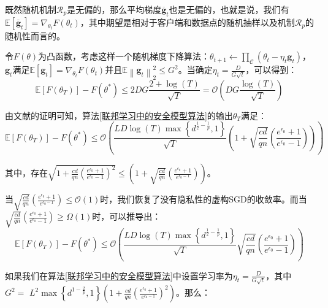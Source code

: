 既然随机机制$\mathcal{R}_{p}$是无偏的，那么平均梯度$\overline{\mathbf{g}}_{t}$也是无偏的，也就是说，我们有 $\mathbb{E}\left[\overline{\mathbf{g}}_{t}\right]=\nabla_{\theta_{t}} F\left(\theta_{t}\right)$，其中期望是相对于客户端和数据点的随机抽样以及机制$\mathcal{R}_{p}$的随机性而言的。

令$F(\theta)$为凸函数，考虑这样一个随机梯度下降算法：$\theta_{t+1} \leftarrow \prod_{\mathcal{C}}\left(\theta_{t}-\eta_{t} \mathbf{g}_{t}\right)$，$\mathbf{g}_{t}$满足$\mathbb{E}\left[\mathbf{g}_{t}\right]=\nabla_{\theta_{t}} F\left(\theta_{t}\right)$并且$\mathbb{E}\left\|\mathbf{g}_{t}\right\|_{2}^{2} \leq G^{2}$。当确定$\eta_{t}=\frac{D}{G \sqrt{t}}$，可以得到：
\begin{equation}\label{eq：模型收敛性证明1}
\mathbb{E}\left[F\left(\theta_{T}\right)\right]-F\left(\theta^{*}\right) \leq 2 D G \frac{2+\log (T)}{\sqrt{T}}=\mathcal{O}\left(D G \frac{\log (T)}{\sqrt{T}}\right)
\end{equation} 

由文献的证明可知，算法\ref{联邦学习中的安全模型算法}的输出$\theta_{T}$满足：
\begin{equation}\label{eq:模型收敛性证明2}
\mathbb{E}\left[F\left(\theta_{T}\right)\right]-F\left(\theta^{*}\right) \leq \mathcal{O}\left(\frac{L D \log (T) \max \left\{d^{\frac{1}{2}-\frac{1}{p}}, 1\right\}}{\sqrt{T}}\left(1+\sqrt{\frac{c d}{q n}}\left(\frac{e^{\epsilon_{0}}+1}{e^{\epsilon_{0}}-1}\right)\right)\right)
\end{equation}

其中，存在$\sqrt{1+\frac{c d}{q n}\left(\frac{e^{\epsilon_{0}}+1}{e^{\epsilon_{0}}-1}\right)^{2}} \leq\left(1+\sqrt{\frac{c d}{q n}}\left(\frac{e^{\epsilon_{0}}+1}{e^{\epsilon_{0}-1}}\right)\right)$。

当$\sqrt{\frac{c d}{q n}}\left(\frac{e^{\epsilon_{0}}+1}{e^{\epsilon_{0}-1}}\right) \leq \mathcal{O}(1)$时，我们恢复了没有隐私性的虚构SGD的收敛率。而当$\sqrt{\frac{c d}{q n}}\left(\frac{e^{\epsilon_{0}}+1}{e^{\epsilon_{0}}-1}\right) \geq \Omega(1)$时，可以推导出：
\begin{equation}\label{eq:模型收敛性证明3}
\mathbb{E}\left[F\left(\theta_{T}\right)\right]-F\left(\theta^{*}\right) \leq \mathcal{O}\left(\frac{L D \log (T) \max \left\{d^{\frac{1}{2}-\frac{1}{p}}, 1\right\}}{\sqrt{T}} \sqrt{\frac{c d}{q n}}\left(\frac{e^{\epsilon_{0}}+1}{e^{\epsilon_{0}}-1}\right)\right)
\end{equation}

如果我们在算法\ref{联邦学习中的安全模型算法}中设置学习率为$\eta_{t}=\frac{D}{G \sqrt{t}}$，其中\\$G^{2}=$ $L^{2} \max \left\{d^{1-\frac{2}{p}}, 1\right\}\left(1+\frac{c d}{q n}\left(\frac{e^{\epsilon_{0}}+1}{e^{\epsilon_{0}-1}}\right)^{2}\right)$。那么：

